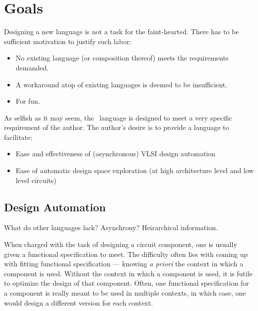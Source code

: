 

\chapter{Goals}
\label{sec:goals}

Designing a new language is not a task for the faint-hearted.  
There has to be sufficient motivation to justify such labor:

\begin{itemize}
\item No existing language (or composition thereof)
	meets the requirements demanded.  
\item A workaround atop of existing languages is deemed to be insufficient.
\item For fun.  
\end{itemize}

As selfish as it may seem, the \hac\ language is designed to meet a very
specific requirement of the author.  
The author's desire is to provide a language to facilitate:

\begin{itemize}
\item Ease and effectiveness of (asynchronous) VLSI design automation
\item Ease of automatic design space exploration 
	(at high architecture level and low level circuits)
\end{itemize}

\section{Design Automation}
\label{sec:goals:EDA}

What do other languages lack?
Asynchrony?
Heirarchical information.  

When charged with the task of designing a circuit component, 
one is usually given a functional specification to meet.  
The difficulty often lies with coming up with fitting 
functional specification ---
knowing \emph{a priori} the context in which a component is used.  
Without the context in which a component is used, 
it is futile to optimize the design of that component.  
Often, one functional specification for a component is really 
meant to be used in multiple contexts, in which case, 
one would design a different version for each context.  

